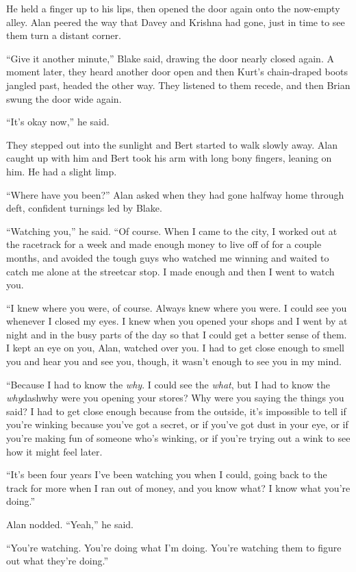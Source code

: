He held a finger up to his lips, then opened the door again onto the
now-empty alley.  Alan peered the way that Davey and Krishna had gone,
just in time to see them turn a distant corner.

``Give it another minute,'' Blake said, drawing the door nearly closed
again.  A moment later, they heard another door open and then Kurt's
chain-draped boots jangled past, headed the other way.  They listened
to them recede, and then Brian swung the door wide again.

``It's okay now,'' he said.

They stepped out into the sunlight and Bert started to walk slowly
away.  Alan caught up with him and Bert took his arm with long bony
fingers, leaning on him.  He had a slight limp.

``Where have you been?'' Alan asked when they had gone halfway home
through deft, confident turnings led by Blake.

``Watching you,'' he said.  ``Of course.  When I came to the city, I
worked out at the racetrack for a week and made enough money to live
off of for a couple months, and avoided the tough guys who watched me
winning and waited to catch me alone at the streetcar stop.  I made
enough and then I went to watch you.

``I knew where you were, of course.  Always knew where you were.  I
could see you whenever I closed my eyes.  I knew when you opened your
shops and I went by at night and in the busy parts of the day so that
I could get a better sense of them.  I kept an eye on you, Alan,
watched over you.  I had to get close enough to smell you and hear you
and see you, though, it wasn't enough to see you in my mind.

``Because I had to know the \textit{why}.  I could see the
\textit{what}, but I had to know the \textit{why}dash{}why were you
opening your stores?  Why were you saying the things you said?  I had
to get close enough because from the outside, it's impossible to tell
if you're winking because you've got a secret, or if you've got dust
in your eye, or if you're making fun of someone who's winking, or if
you're trying out a wink to see how it might feel later.

``It's been four years I've been watching you when I could, going back
to the track for more when I ran out of money, and you know what?  I
know what you're doing.''

Alan nodded.  ``Yeah,'' he said.

``You're watching.  You're doing what I'm doing.  You're watching them
to figure out what they're doing.''


